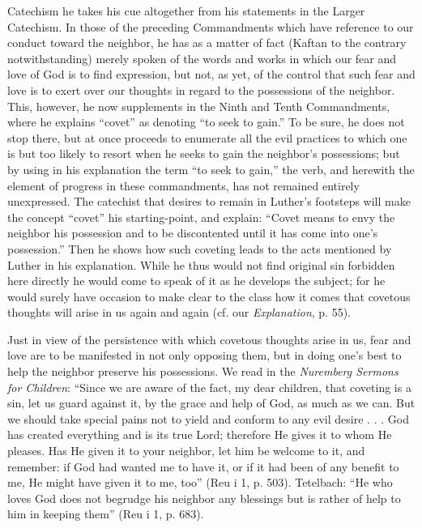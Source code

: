 Catechism he takes his cue altogether from his statements in the Larger Catechism. In those of the preceding Commandments which have reference to our conduct toward the neighbor, he has as a matter of fact (Kaftan to the contrary notwithstanding) merely spoken of the words and works in which our fear and love of God is to find expression, but not, as yet, of the control that such fear and love is to exert over our thoughts in regard to the possessions of the neighbor. This, however, he now supplements in the Ninth and Tenth Commandments, where he explains “covet” as denoting “to seek to gain.” To be sure, he does not stop there, but at once proceeds to enumerate all the evil practices to which one is but too likely to resort when he seeks to gain the neighbor’s possessions; but by using in his explanation the term “to seek to gain,” the verb, and herewith the element of progress in these commandments, has not remained entirely unexpressed. The catechist that desires to remain in Luther’s footsteps will make the concept “covet” his starting-point, and explain: “Covet means to envy the neighbor his possession and to be discontented until it has come into one’s possession.” Then he shows how such coveting leads to the acts mentioned by Luther in his explanation. While he thus would not find original sin forbidden here directly he would come to speak of it as he develops the subject; for he would surely have occasion to make clear to the class how it comes that covetous thoughts will arise in us again and again (cf. our \emph{Explanation}, p. 55).

Just in view of the persistence with which covetous thoughts arise in us, fear and love are to be manifested in not only opposing them, but in doing one’s best to help the neighbor preserve his possessions. We read in the \emph{Nuremberg Sermons for Children}: “Since we are aware of the fact, my dear children, that coveting is a sin, let us guard against it, by the grace and help of God, as much as we can. But we should take special pains not to yield and conform to any evil desire . . . God has created everything and is its true Lord; therefore He gives it to whom He pleases. Has He given it to your neighbor, let him be welcome to it, and remember: if God had wanted me to have it, or if it had been of any benefit to me, He might have given it to me, too” (Reu i 1, p. 503). Tetelbach: “He who loves God does not begrudge his neighbor any blessings but is rather of help to him in keeping them” (Reu i 1, p. 683).

